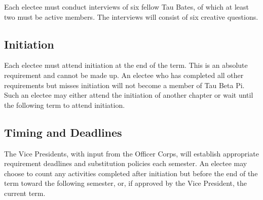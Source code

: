 Each electee must conduct interviews of six fellow Tau
Bates, of which at least two must be active members. The interviews will consist of six
creative questions.


\subsection{Initiation} \label{A.9}

Each electee must attend initiation at the end of the term.
This is an absolute requirement and cannot be made up. An electee who has completed all
other requirements but misses initiation will not become a member of Tau Beta Pi. Such an
electee may either attend the initiation of another chapter or wait until the following term
to attend initiation.


\subsection{Timing and Deadlines} \label{A.10}

The Vice Presidents, with input from the Officer Corps, will establish appropriate requirement deadlines and substitution policies each semester. 
An electee may choose to count any activities completed after initiation but before the end of the term toward the following semester, or, if approved by the Vice President, the current term.